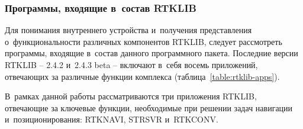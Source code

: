 \subsubsection{Программы, входящие в~состав RTKLIB}
\label{subsec:rtklib-apps}

Для понимания внутреннего устройства и~получения представления о~функциональности различных компонентов RTKLIB, следует рассмотреть программы, входящие в~состав данного программного пакета. Последние версии RTKLIB -- 2.4.2 и~2.4.3 beta -- включают в~себя восемь приложений, отвечающих за различные функции комплекса (таблица~\ref{table:rtklib-apps}). \par


В~рамках данной работы рассматриваются три приложения RTKLIB, отвечающие за ключевые функции, необходимые при решении задач навигации и~позиционирования: RTKNAVI, STRSVR и~RTKCONV.

